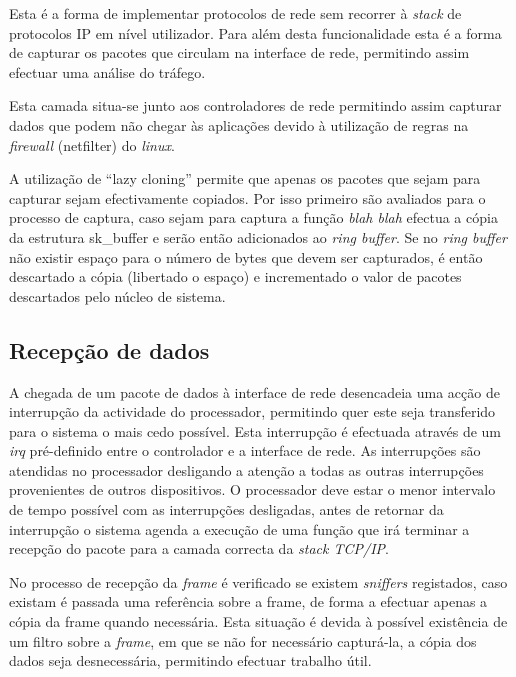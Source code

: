 Esta é a forma de implementar protocolos de rede sem recorrer à \textit{stack}
de protocolos IP em nível utilizador. Para além desta funcionalidade esta é a
forma de capturar os pacotes que circulam na interface de rede, permitindo
assim efectuar uma análise do tráfego.

Esta camada situa-se junto aos controladores de rede permitindo assim capturar
dados que podem não chegar às aplicações devido à utilização de regras na
\textit{firewall} (netfilter) do \textit{linux}.

A utilização de ``lazy cloning'' permite que apenas os pacotes que sejam para
capturar sejam efectivamente copiados. Por isso primeiro são avaliados para o
processo de captura, caso sejam para captura a função \textit{blah blah}
efectua a cópia da estrutura sk\_buffer e serão então adicionados ao
\textit{ring buffer}. Se no \textit{ring buffer} não existir espaço para o
número de bytes que devem ser capturados, é então descartado a cópia
(libertado o espaço) e incrementado o valor de pacotes descartados pelo núcleo
de sistema.

\subsection{Recepção de dados}

A chegada de um pacote de dados à interface de rede desencadeia uma acção de interrupção da actividade do processador, permitindo quer este seja transferido para o sistema o mais cedo possível. Esta interrupção é efectuada através de um \textit{irq} pré-definido entre o controlador e a interface de rede. As interrupções são atendidas no processador desligando a atenção a todas as outras interrupções provenientes de outros dispositivos. %
O processador deve estar o menor intervalo de tempo possível com as interrupções desligadas, antes de retornar da interrupção o sistema agenda a execução de uma função que irá terminar a recepção do pacote para a camada correcta da \textit{stack TCP/IP}.%

No processo de recepção da \textit{frame} é verificado se existem \textit{sniffers} registados, caso existam é passada uma referência sobre a frame, de forma a efectuar apenas a cópia da frame quando necessária. Esta situação é devida à possível existência de um filtro sobre a \textit{frame}, em que se não for necessário capturá-la, a cópia dos dados seja desnecessária, permitindo efectuar trabalho útil.

